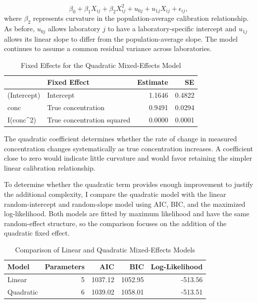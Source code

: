 \documentclass[
]{article}
\begin{document}
\[
\beta_0 + \beta_1X_{ij} + \beta_2X_{ij}^{2} + u_{0j} + u_{1j}X_{ij} + \epsilon_{ij},
\] where \(\beta_2\) represents curvature in the population-average
calibration relationship. As before, \(u_{0j}\) allows laboratory \(j\)
to have a laboratory-specific intercept and \(u_{1j}\) allows its linear
slope to differ from the population-average slope. The model continues
to assume a common residual variance across laboratories.

\begin{table}[!h]
\centering
\caption{\label{tab:quadratic}Fixed Effects for the Quadratic Mixed-Effects Model}
\centering
\begin{tabular}[t]{llrr}
\toprule
  & Fixed Effect & Estimate & SE\\
\midrule
(Intercept) & Intercept & 1.1646 & 0.4822\\
conc & True concentration & 0.9491 & 0.0294\\
I(conc\textasciicircum{}2) & True concentration squared & 0.0000 & 0.0001\\
\bottomrule
\end{tabular}
\end{table}

The quadratic coefficient determines whether the rate of change in
measured concentration changes systematically as true concentration
increases. A coefficient close to zero would indicate little curvature
and would favor retaining the simpler linear calibration relationship.

To determine whether the quadratic term provides enough improvement to
justify the additional complexity, I compare the quadratic model with
the linear random-intercept and random-slope model using AIC, BIC, and
the maximized log-likelihood. Both models are fitted by maximum
likelihood and have the same random-effect structure, so the comparison
focuses on the addition of the quadratic fixed effect.

\begin{table}[!h]
\centering
\caption{\label{tab:comparison linear quadratic}Comparison of Linear and Quadratic Mixed-Effects Models}
\centering
\begin{tabular}[t]{lrrrr}
\toprule
Model & Parameters & AIC & BIC & Log-Likelihood\\
\midrule
Linear & 5 & 1037.12 & 1052.95 & -513.56\\
Quadratic & 6 & 1039.02 & 1058.01 & -513.51\\
\bottomrule
\end{tabular}
\end{table}
\end{document}
